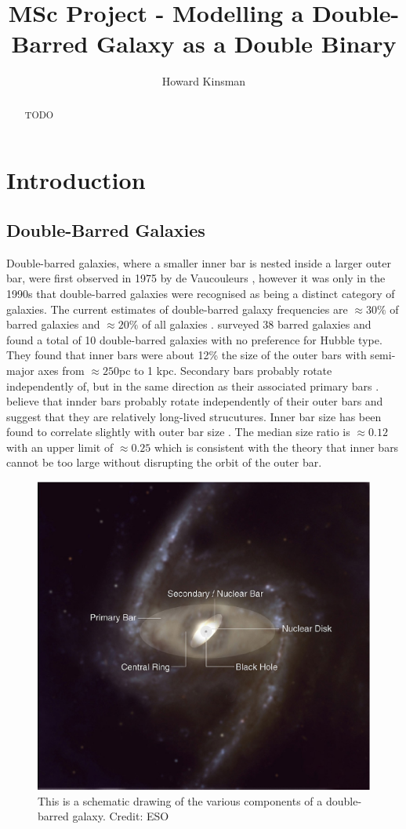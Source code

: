 \documentclass[a4paper,12pt]{article}
\author{Howard Kinsman}
\title{MSc Project - Modelling a Double-Barred Galaxy as a Double Binary}
\begin{document}
\maketitle
\begin{abstract}
TODO
\end{abstract}
\section{Introduction}
\subsection{Double-Barred Galaxies} 
Double-barred galaxies, where a smaller inner bar is nested inside a larger outer bar, were first observed in 1975 by de Vaucouleurs \citep{vaucouleurs}, however it was only in the 1990s that double-barred galaxies
were recognised as being a distinct category of galaxies. The current estimates of double-barred galaxy frequencies are $\approx30\%$ of barred galaxies and $\approx20\%$ of all galaxies \citep{erwin3}.
\cite{erwin2} surveyed 38 barred galaxies and found a total of 10 double-barred galaxies with no preference for Hubble type. They found that inner bars were about 12\% the size of the outer bars with
semi-major axes from $\approx250$pc to 1 kpc. Secondary bars probably rotate independently of, but in the same direction as their associated primary bars \cite{erwin2}.
\cite{erwin1} believe that innder bars probably rotate independently of their outer bars and suggest that they are relatively long-lived strucutures.
Inner bar size has been found to correlate slightly with outer bar size \citep{erwin3}. The median size ratio is $\approx0.12$ with an upper limit of $\approx0.25$ which is consistent with the theory that
inner bars cannot be too large without disrupting the orbit of the outer bar.

\begin{figure}[H]
\centering
\includegraphics[width=.9\textwidth]{./eso0128d.eps}
\caption{This is a schematic drawing of the various components of a double-barred galaxy. Credit: ESO}
\label{fig:doublepic}
\end{figure}
\end{document}
